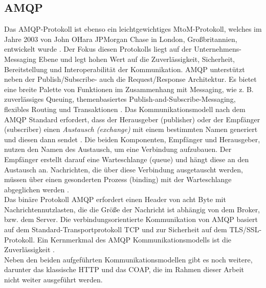    \subsection{AMQP}
    \label{subsec:amqp}
        Das \ac{AMQP}-Protokoll ist ebenso ein leichtgewichtiges \acs{MtoM}-Protokoll, welches im Jahre 2003 von John O\'Hara JPMorgan Chase 
        in London, Großbritannien, entwickelt wurde \cite{Naik2017}. Der Fokus diesen Protokolls liegt auf der Unternehmens-Messaging Ebene 
        und legt hohen Wert auf die Zuverlässigkeit, Sicherheit, Bereitstellung und Interoperabilität der Kommunikation. \acs{AMQP} 
        unterstützt neben der Publish/Subscribe- auch die Request/Response Architektur. Es bietet eine breite Palette von 
        Funktionen im Zusammenhang mit Messaging, wie z. B. zuverlässiges Queuing, themenbasiertes Publish-and-Subscribe-Messaging, 
        flexibles Routing und Transaktionen \cite{Naik2017}. Das Kommunikationsmodell nach dem \acs{AMQP} Standard erfordert, dass der 
        Herausgeber (publisher) oder der Empfänger (subscriber) einen \textit{Austausch (exchange)} mit einem bestimmten Namen generiert 
        und diesen dann sendet \cite{Naik2017}. Die beiden Komponenten, Empfänger und Herausgeber, nutzen den Namen des Austausch, um eine 
        Verbindung aufzubauen. Der Empfänger erstellt darauf eine Warteschlange (queue) und hängt diese an den Austausch an. Nachrichten, die 
        über diese Verbindung ausgetauscht werden, müssen über einen gesonderten Prozess (binding) mit der Warteschlange abgeglichen werden 
        \cite{Naik2017}.
        \\ 
        Das binäre Protokoll \acs{AMQP} erfordert einen Header von acht Byte mit Nachrichtennutzlasten, die die Größe der Nachricht ist abhängig 
        von dem Broker, bzw. dem Server. Die verbindungsorientierte Kommunikation von \acs{AMQP} basiert auf dem Standard-Transportprotokoll 
        \acs{TCP} und zur Sicherheit auf dem \acs{TLS}/\acs{SSL}-Protokoll. Ein Kernmerkmal des \acs{AMQP} Kommunikationsmodells ist die 
        Zuverlässigkeit \cite{Naik2017}. 
        \\
        \linebreak
        Neben den beiden aufgeführten Kommunikationsmodellen gibt es noch weitere, darunter das klassische \ac{HTTP} und das \ac{COAP}, die %
        im Rahmen dieser Arbeit nicht weiter ausgeführt werden. 
        
